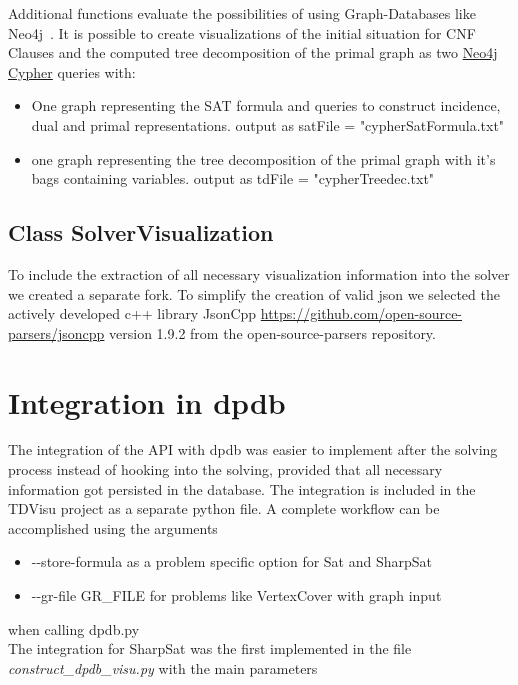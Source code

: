 \documentclass[a4paper, 12pt, bibliography=totoc]{scrartcl}
\begin{document}
Additional functions evaluate the possibilities of using Graph-Databases like Neo4j~\cite{graphdatabases}.
It is possible to create visualizations of the initial situation for CNF Clauses and the computed tree decomposition of the primal graph as two \href{https://neo4j.com/docs/cypher-refcard/current/}{Neo4j Cypher} queries with:
\begin{itemize}
	\item One graph representing the SAT formula and  queries to construct incidence, dual and primal representations.
	output as satFile = "cypherSatFormula.txt"
	\item one graph representing the tree decomposition of the primal graph with it's bags containing variables.
	output as tdFile = "cypherTreedec.txt"
\end{itemize}

\subsection{Class SolverVisualization}

To include the extraction of all necessary visualization information into the solver we created a separate fork.
To simplify the creation of valid json we selected the actively developed c++ library JsonCpp \url{https://github.com/open-source-parsers/jsoncpp} version 1.9.2 from the open-source-parsers repository.

\newpage
\section{Integration in dpdb}\label{sec:dpdb}
The integration of the API with dpdb was easier to implement after the solving process instead of hooking into the solving, 
provided that all necessary information got persisted in the database.
The integration is included in the TDVisu project as a separate python file.
A complete workflow can be accomplished using the arguments
\begin{itemize}
	\item -{}-store-formula as a problem specific option for Sat and SharpSat
	\item -{}-gr-file GR\_FILE for problems like VertexCover with graph input 
\end{itemize}
when calling dpdb.py\\
The integration for SharpSat was the first implemented in the file \textit{construct\_dpdb\_visu.py} with
the main parameters
\end{document}
